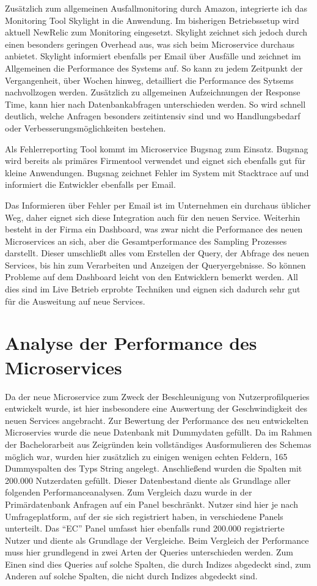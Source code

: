 Zusätzlich zum allgemeinen Ausfallmonitoring durch Amazon, integrierte ich das Monitoring Tool Skylight\cite{skylight} in die Anwendung. Im bisherigen Betriebssetup wird aktuell NewRelic\cite{newrelic} zum Monitoring eingesetzt. Skylight zeichnet sich jedoch durch einen besonders geringen Overhead aus, was sich beim Microservice durchaus anbietet. Skylight informiert ebenfalls per Email über Ausfälle und zeichnet im Allgemeinen die Performance des Systems auf. So kann zu jedem Zeitpunkt der Vergangenheit, über Wochen hinweg, detailliert die Performance des Sytsems nachvollzogen werden. Zusätzlich zu allgemeinen Aufzeichnungen der Response Time, kann hier nach Datenbankabfragen unterschieden werden. So wird schnell deutlich, welche Anfragen besonders zeitintensiv sind und wo Handlungsbedarf oder Verbesserungsmöglichkeiten bestehen. 

Als Fehlerreporting Tool kommt im Microservice Bugsnag\cite{bugsnag} zum Einsatz. Bugsnag wird bereits als primäres Firmentool verwendet und eignet sich ebenfalls gut für kleine Anwendungen. Bugsnag zeichnet Fehler im System mit Stacktrace auf und informiert die Entwickler ebenfalls per Email.

Das Informieren über Fehler per Email ist im Unternehmen ein durchaus üblicher Weg, daher eignet sich diese Integration auch für den neuen Service. Weiterhin besteht in der Firma ein Dashboard, was zwar nicht die Performance des neuen Microservices an sich, aber die Gesamtperformance des Sampling Prozesses darstellt. Dieser umschließt alles vom Erstellen der Query, der Abfrage des neuen Services, bis hin zum Verarbeiten und Anzeigen der Queryergebnisse. So können Probleme auf dem Dashboard leicht von den Entwicklern bemerkt werden. All dies sind im Live Betrieb erprobte Techniken und eignen sich dadurch sehr gut für die Ausweitung auf neue Services.

\section{Analyse der Performance des Microservices}
Da der neue Microservice zum Zweck der Beschleunigung von Nutzerprofilqueries entwickelt wurde, ist hier insbesondere eine Auswertung der Geschwindigkeit des neuen Services angebracht. 
Zur Bewertung der Performance des neu entwickelten Microservies wurde die neue Datenbank mit Dummydaten gefüllt. Da im Rahmen der Bachelorarbeit aus Zeigründen kein vollständiges Ausformulieren des Schemas möglich war, wurden hier zusätzlich zu einigen wenigen echten Feldern, 165 Dummyspalten des Typs String angelegt. Anschließend wurden die Spalten mit 200.000 Nutzerdaten gefüllt. Dieser Datenbestand diente als Grundlage aller folgenden Performanceanalysen. Zum Vergleich dazu wurde in der Primärdatenbank Anfragen auf ein Panel beschränkt. Nutzer sind hier je nach Umfrageplatform, auf der sie sich registriert haben, in verschiedene Panels unterteilt. Das ``EC'' Panel umfasst hier ebenfalls rund 200.000 registrierte Nutzer und diente als Grundlage der Vergleiche.
Beim Vergleich der Performance muss hier grundlegend in zwei Arten der Queries unterschieden werden. Zum Einen sind dies Queries auf solche Spalten, die durch Indizes abgedeckt sind, zum Anderen auf solche Spalten, die nicht durch Indizes abgedeckt sind.

